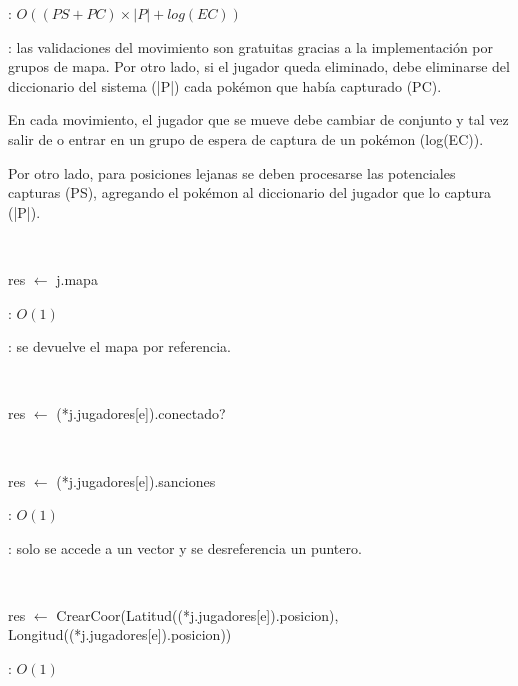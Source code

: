 \begin{Algoritmos}
	\complejidad: $O((PS + PC) \times |P| + log(EC))$

	\justifcomp: las validaciones del movimiento son gratuitas gracias a la implementación por grupos de mapa. Por otro lado, si el jugador queda eliminado, debe eliminarse del diccionario del sistema (|P|) cada pokémon que había capturado (PC).

	En cada movimiento, el jugador que se mueve debe cambiar de conjunto y tal vez salir de o entrar en un grupo de espera de captura de un pokémon (log(EC)).

	Por otro lado, para posiciones lejanas se deben procesarse las potenciales capturas (PS), agregando el pokémon al diccionario del jugador que lo captura (|P|).

	~

	\begin{algorithm}[H]
		\NoCaptionOfAlgo
		\caption{}
		res $\leftarrow$ j.mapa
	\end{algorithm}

	\complejidad: $O(1)$

	\justifcomp: se devuelve el mapa por referencia.

	~

	\begin{algorithm}[H]
		\NoCaptionOfAlgo
		\caption{}
		res $\leftarrow$ (*j.jugadores[e]).conectado?
	\end{algorithm}

	~

	\begin{algorithm}[H]
		\NoCaptionOfAlgo
		\caption{}
		res $\leftarrow$ (*j.jugadores[e]).sanciones
	\end{algorithm}

	\complejidad: $O(1)$

	\justifcomp: solo se accede a un vector y se desreferencia un puntero.

	~

	\begin{algorithm}[H]
		\NoCaptionOfAlgo
		\caption{}
		res $\leftarrow$ CrearCoor(Latitud((*j.jugadores[e]).posicion), Longitud((*j.jugadores[e]).posicion))
	\end{algorithm}

	\complejidad: $O(1)$


\end{Algoritmos}
